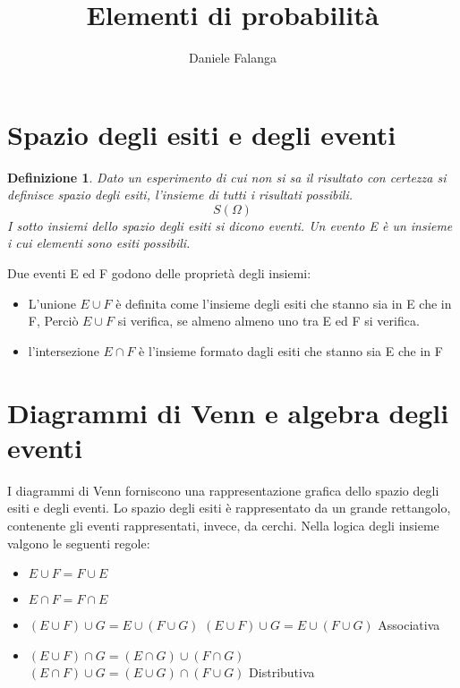 \documentclass[12pt]{article}
\title{\textbf{Elementi di probabilità}}
\author{Daniele Falanga}
\date{}
\newtheorem{definition}{Definizione}[section]
\begin{document}
\maketitle

\section{Spazio degli esiti e degli eventi}

\begin{definition}
    Dato un esperimento di cui non si sa il risultato con certezza
    si definisce spazio degli esiti, l'insieme di tutti i risultati
    possibili. 
    \[
    S(\Omega)    
    \]
    I sotto insiemi dello spazio degli esiti si dicono eventi. 
    Un evento E è un insieme i cui elementi sono esiti possibili.
\end{definition}

Due eventi E ed F godono delle proprietà degli insiemi: 
\begin{itemize}
    \item L'unione \(E \cup F \) è definita come l'insieme degli
    esiti che stanno sia in E che in F, Perciò \(E \cup F \) si verifica, se almeno 
    almeno uno tra E ed F si verifica. 
    \item l'intersezione \( E \cap F\) è l'insieme formato dagli esiti
    che stanno sia E che in F 
\end{itemize}

\section{Diagrammi di Venn e algebra degli eventi}
I diagrammi di Venn forniscono una rappresentazione grafica dello spazio
degli esiti e degli eventi. Lo spazio degli esiti è rappresentato 
da un grande rettangolo, contenente gli eventi rappresentati, invece, da cerchi. 
Nella logica degli insieme valgono le seguenti regole: 

\begin{itemize}
    \item \(E \cup F = F \cup E\)
    \item \(E \cap F = F \cap E\)
    \item \((E \cup F) \cup G = E \cup (F \cup G)\) \quad \((E \cup F) \cup G = E \cup (F \cup G)\) \quad Associativa
    \item \((E \cup F) \cap G = (E \cap G) \cup (F \cap G) \) \quad \((E \cap F) \cup G = (E \cup G) \cap (F \cup G) \) \quad Distributiva
\end{itemize}
\end{document}
